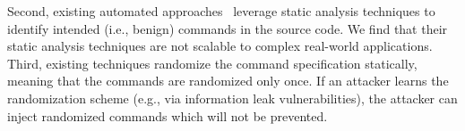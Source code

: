 Second, existing automated approaches~\cite{autorand,sqlrand-llvm} leverage static analysis techniques to identify intended (i.e., benign) commands in the source code. We find that their static analysis techniques are not scalable to complex real-world applications. %
\vspace{-0.3em}
Third, existing techniques randomize the command specification statically, meaning that the commands are randomized only once. If an attacker learns the randomization scheme (e.g., via information leak vulnerabilities), the attacker can inject randomized commands which will not be prevented.
\vspace{-0.3em}



